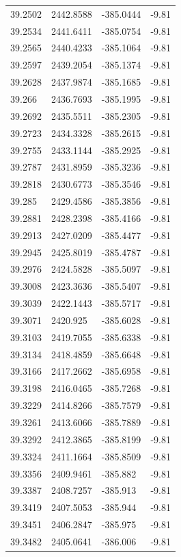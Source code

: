 \begin{table}[H]
\begin{tabular}{llll}
39.2502 & 2442.8588 & -385.0444 & -9.81 \\
39.2534 & 2441.6411 & -385.0754 & -9.81 \\
39.2565 & 2440.4233 & -385.1064 & -9.81 \\
39.2597 & 2439.2054 & -385.1374 & -9.81 \\
39.2628 & 2437.9874 & -385.1685 & -9.81 \\
39.266 & 2436.7693 & -385.1995 & -9.81 \\
39.2692 & 2435.5511 & -385.2305 & -9.81 \\
39.2723 & 2434.3328 & -385.2615 & -9.81 \\
39.2755 & 2433.1144 & -385.2925 & -9.81 \\
39.2787 & 2431.8959 & -385.3236 & -9.81 \\
39.2818 & 2430.6773 & -385.3546 & -9.81 \\
39.285 & 2429.4586 & -385.3856 & -9.81 \\
39.2881 & 2428.2398 & -385.4166 & -9.81 \\
39.2913 & 2427.0209 & -385.4477 & -9.81 \\
39.2945 & 2425.8019 & -385.4787 & -9.81 \\
39.2976 & 2424.5828 & -385.5097 & -9.81 \\
39.3008 & 2423.3636 & -385.5407 & -9.81 \\
39.3039 & 2422.1443 & -385.5717 & -9.81 \\
39.3071 & 2420.925 & -385.6028 & -9.81 \\
39.3103 & 2419.7055 & -385.6338 & -9.81 \\
39.3134 & 2418.4859 & -385.6648 & -9.81 \\
39.3166 & 2417.2662 & -385.6958 & -9.81 \\
39.3198 & 2416.0465 & -385.7268 & -9.81 \\
39.3229 & 2414.8266 & -385.7579 & -9.81 \\
39.3261 & 2413.6066 & -385.7889 & -9.81 \\
39.3292 & 2412.3865 & -385.8199 & -9.81 \\
39.3324 & 2411.1664 & -385.8509 & -9.81 \\
39.3356 & 2409.9461 & -385.882 & -9.81 \\
39.3387 & 2408.7257 & -385.913 & -9.81 \\
39.3419 & 2407.5053 & -385.944 & -9.81 \\
39.3451 & 2406.2847 & -385.975 & -9.81 \\
39.3482 & 2405.0641 & -386.006 & -9.81 \\

\end{tabular}
\end{table}
